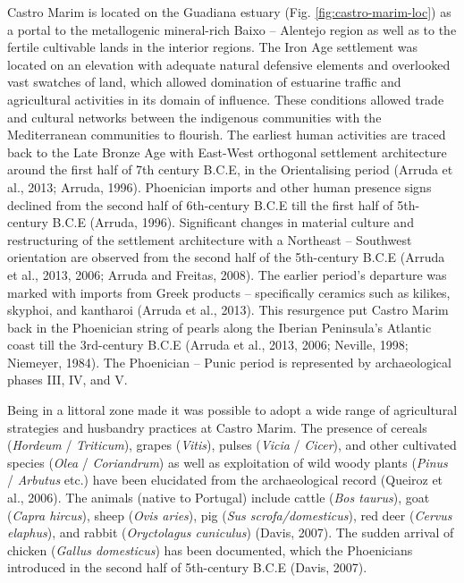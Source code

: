 \documentclass[5p]{elsarticle} %
\begin{document}
Castro Marim is located on the Guadiana estuary (Fig. \ref{fig:castro-marim-loc}) as a portal to the metallogenic mineral-rich Baixo -- Alentejo region as well as to the fertile cultivable lands in the interior regions. The Iron Age settlement was located on an elevation with adequate natural defensive elements and overlooked vast swatches of land, which allowed domination of estuarine traffic and agricultural activities in its domain of influence. These conditions allowed trade and cultural networks between the indigenous communities with the Mediterranean communities to flourish. The earliest human activities are traced back to the Late Bronze Age with East-West orthogonal settlement architecture around the first half of 7th century B.C.E, in the Orientalising period (Arruda et al., 2013; Arruda, 1996). Phoenician imports and other human presence signs declined from the second half of 6th-century B.C.E till the first half of 5th-century B.C.E (Arruda, 1996). Significant changes in material culture and restructuring of the settlement architecture with a Northeast -- Southwest orientation are observed from the second half of the 5th-century B.C.E (Arruda et al., 2013, 2006; Arruda and Freitas, 2008). The earlier period's departure was marked with imports from Greek products -- specifically ceramics such as kilikes, skyphoi, and kantharoi (Arruda et al., 2013). This resurgence put Castro Marim back in the Phoenician string of pearls along the Iberian Peninsula's Atlantic coast till the 3rd-century B.C.E (Arruda et al., 2013, 2006; Neville, 1998; Niemeyer, 1984). The Phoenician -- Punic period is represented by archaeological phases III, IV, and V.

Being in a littoral zone made it was possible to adopt a wide range of agricultural strategies and husbandry practices at Castro Marim. The presence of cereals (\emph{Hordeum} / \emph{Triticum}), grapes (\emph{Vitis}), pulses (\emph{Vicia} / \emph{Cicer}), and other cultivated species (\emph{Olea} / \emph{Coriandrum}) as well as exploitation of wild woody plants (\emph{Pinus} / \emph{Arbutus} etc.) have been elucidated from the archaeological record (Queiroz et al., 2006). The animals (native to Portugal) include cattle (\emph{Bos taurus}), goat (\emph{Capra hircus}), sheep (\emph{Ovis aries}), pig (\emph{Sus scrofa/domesticus}), red deer (\emph{Cervus elaphus}), and rabbit (\emph{Oryctolagus cuniculus}) (Davis, 2007). The sudden arrival of chicken (\emph{Gallus domesticus}) has been documented, which the Phoenicians introduced in the second half of 5th-century B.C.E (Davis, 2007).
\end{document}
